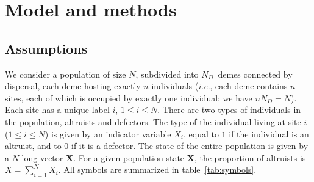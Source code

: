 \documentclass[11pt, letterpaper]{article}
\newcommand{\ie}{\textit{i.e.}}
\newcommand{\ndemes}{N_D}
\begin{document}



\section*{Model and methods}

\subsection*{Assumptions}

We consider a population of size $N$, subdivided into $\ndemes$~demes connected by dispersal, each deme hosting exactly $n$ individuals (\ie, each deme contains $n$ sites, each of which is occupied by exactly one individual; we have $n \ndemes = N$). Each site has a unique label $i$, $1\leq i \leq N$. There are two types of individuals in the population, altruists and defectors. The type of the individual living at site $i$ ($1\leq i \leq N$) is given by an indicator variable $X_i$, equal to $1$ if the individual is an altruist, and to $0$ if it is a defector. The state of the entire population is given by a $N$-long vector $\mathbf{X}$. For a given population state $\mathbf{X}$, the proportion of altruists is $\overline{X} = \sum_{i=1}^N X_i$. All symbols are summarized in table~\ref{tab:symbols}.
\end{document}
